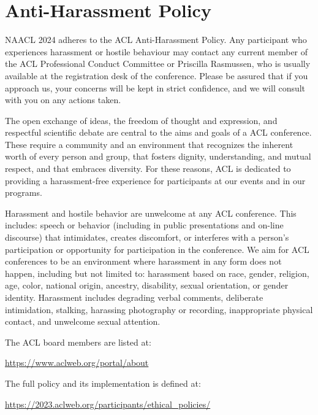 \chapter[Anti-Harassment Policy]{Anti-Harassment Policy}
\thispagestyle{emptyheader}
\setheaders{}{}

NAACL 2024 adheres to the ACL Anti-Harassment Policy. Any participant who experiences harassment or hostile behaviour may contact any current member of the ACL Professional Conduct Committee or Priscilla Rasmussen, who is usually available at the registration desk of the conference. Please be assured that if you approach us, your concerns will be kept in strict confidence, and we will consult with you on any actions taken.

\vspace{0.5em} 

The open exchange of ideas, the freedom of thought and expression, and respectful scientific debate are central to the aims and goals of a ACL conference. These require a community and an environment that recognizes the inherent worth of every person and group, that fosters dignity, understanding, and mutual respect, and that embraces diversity. For these reasons, ACL is dedicated to providing a harassment-free experience for participants at our events and in our programs.

\vspace{0.5em} 

Harassment and hostile behavior are unwelcome at any ACL conference. This includes: speech or behavior (including in public presentations and on-line discourse) that intimidates, creates discomfort, or interferes with a person's participation or opportunity for participation in the conference. We aim for ACL conferences to be an environment where harassment in any form does not happen, including but not limited to: harassment based on race, gender, religion, age, color, national origin, ancestry, disability, sexual orientation, or gender identity. Harassment includes degrading verbal comments, deliberate intimidation,
stalking, harassing photography or recording, inappropriate physical contact, and unwelcome sexual attention.

\vspace{0.5em} 

The ACL board members are listed at:

\vspace{0.5em} 

\url{https://www.aclweb.org/portal/about}

\vspace{0.5em} 

The full policy and its implementation is defined at:

\vspace{0.5em} 

\url{https://2023.aclweb.org/participants/ethical_policies/}
